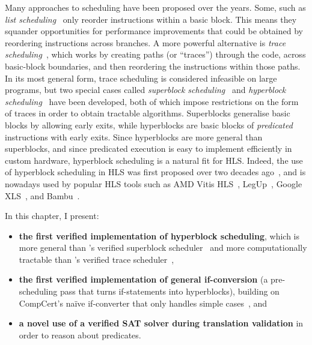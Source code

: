\noindent Many approaches to scheduling have been proposed over the years. Some,
such as \emph{list scheduling}~\cite[][p.257]{baker19_princ} only reorder
instructions within a basic block. This means they squander opportunities for
performance improvements that could be obtained by reordering instructions
across branches. A more powerful alternative is \emph{trace
  scheduling}~\cite{ellis85_bulld, fisher81_trace_sched}, which works by
creating paths (or \enquote{traces}) through the code, across basic-block
boundaries, and then reordering the instructions within those paths. In its most
general form, trace scheduling is considered infeasible on large programs, but
two special cases called \emph{superblock scheduling}~\cite{hwu93_super} and
\emph{hyperblock
  scheduling}~\cite{mahlke92_effec_compil_suppor_predic_execut_using_hyper} have
been developed, both of which impose restrictions on the form of traces in order
to obtain tractable algorithms. Superblocks generalise basic blocks by allowing
early exits, while hyperblocks are basic blocks of \emph{predicated}
instructions with early exits. Since hyperblocks are more general than
superblocks, and since predicated execution is easy to implement efficiently in
custom hardware, hyperblock scheduling is a natural fit for HLS. Indeed, the use
of hyperblock scheduling in HLS was first proposed over two decades
ago~\cite{budiu02_compil_applic_specif_hardw,
  callahan98_instr_level_paral_recon_comput}, and is nowadays used by popular
HLS tools such as AMD Vitis HLS~\cite{amd23_vitis_forum},
LegUp~\cite[][p.60]{canis15_legup}, Google XLS~\cite[line~112]{google23_xls},
and Bambu~\cite[line~304]{ferrandi14_panda_bambu}.


In this chapter, I present:

\begin{itemize}
\item \textbf{the first verified implementation of hyperblock scheduling}, which
  is more general than \citeauthor{six22_formal_verif_super_sched}'s verified
  superblock scheduler~\cite{six22_formal_verif_super_sched} and more
  computationally tractable than
  \citeauthor{tristan08_formal_verif_trans_valid}'s verified trace
  scheduler~\cite{tristan08_formal_verif_trans_valid},
\item \textbf{the first verified implementation of general if-conversion} (a
  pre-scheduling pass that turns if-statements into hyperblocks), building on
  CompCert's na\"ive if-converter that only handles simple
  cases~\cite{absint19_compc}, and
\item \textbf{a novel use of a verified SAT solver during translation
    validation} in order to reason about predicates.
\end{itemize}

